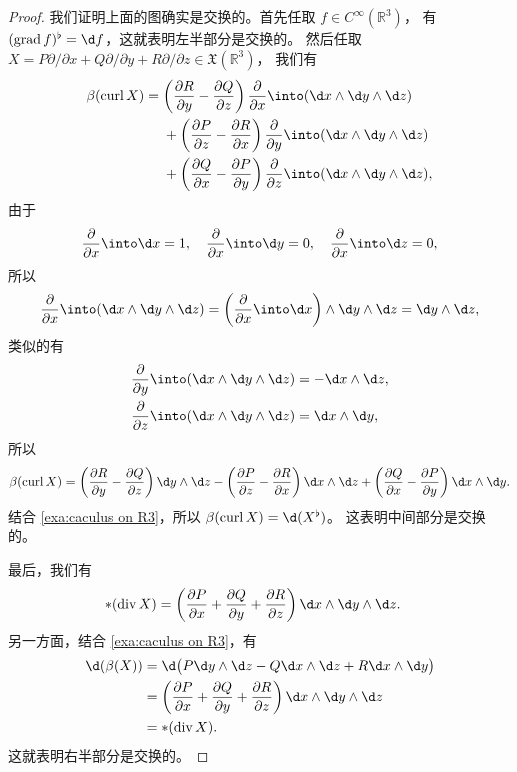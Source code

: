 \begin{proof}
  我们证明上面的图确实是交换的。首先任取 $f\in C^\infty(\mathbb{R}^3)$，
  有 $(\grad f)^\flat =\d f$，这就表明左半部分是交换的。
  然后任取 $X=P\partial/\partial x+Q\partial/\partial y+R\partial/\partial z\in \mathfrak{X}(\mathbb{R}^3)$，
  我们有
  \begin{align*}
    \beta(\curl X)&=
    \left(\frac{\partial R}{\partial y}-\frac{\partial Q}{\partial z}\right)
    \frac{\partial}{\partial x}\into 
    (\d x\wedge\d y\wedge\d z)\\
    &\hphantom{{}={}}
    +\left(\frac{\partial P}{\partial z}-\frac{\partial R}{\partial x}\right)
    \frac{\partial}{\partial y}\into 
    (\d x\wedge\d y\wedge\d z)\\
    &\hphantom{{}={}}
    +\left(\frac{\partial Q}{\partial x}-\frac{\partial P}{\partial y}\right)
    \frac{\partial}{\partial z}\into 
    (\d x\wedge\d y\wedge\d z),
  \end{align*}
  由于
  \begin{equation*}
    \frac{\partial}{\partial x}\into\d x=1,\quad
    \frac{\partial}{\partial x}\into\d y=0,\quad
    \frac{\partial}{\partial x}\into\d z=0,
  \end{equation*}
  所以
  \begin{equation*}
    \frac{\partial}{\partial x}\into 
    (\d x\wedge\d y\wedge\d z)=
    \left(\frac{\partial}{\partial x}\into\d x\right)
    \wedge\d y\wedge\d z=\d y\wedge \d z,
  \end{equation*}
  类似的有
  \begin{align*}
    \frac{\partial}{\partial y}\into 
    (\d x\wedge\d y\wedge\d z)&=-\d x\wedge \d z,\\
    \frac{\partial}{\partial z}\into 
    (\d x\wedge\d y\wedge\d z)&=\d x\wedge \d y,
  \end{align*}
  所以 
  \[
    \beta(\curl X)= 
    \left(\frac{\partial R}{\partial y}-\frac{\partial Q}{\partial z}\right)
    \d y\wedge\d z
    -\left(\frac{\partial P}{\partial z}-\frac{\partial R}{\partial x}\right)
    \d x\wedge\d z
    +\left(\frac{\partial Q}{\partial x}-\frac{\partial P}{\partial y}\right)
    \d x\wedge\d y.
  \]
  结合 \autoref{exa:caculus on R3}，所以 $\beta(\curl X)=\d(X^\flat)$。
  这表明中间部分是交换的。

  最后，我们有
  \begin{align*}
    *(\dive X)&=\left(\frac{\partial P}{\partial x}+\frac{\partial Q}{\partial y}+\frac{\partial R}{\partial z}\right)
    \d x\wedge\d y\wedge\d z.
  \end{align*}
  另一方面，结合 \autoref{exa:caculus on R3}，有
  \begin{align*}
    \d(\beta(X))&=\d\bigl(P\d y\wedge\d z-Q\d x\wedge\d z+R\d x\wedge\d y\bigr)\\
    &=\left(\frac{\partial P}{\partial x}+\frac{\partial Q}{\partial y}+\frac{\partial R}{\partial z}\right)
    \d x\wedge\d y\wedge\d z\\
    &=*(\dive X).
  \end{align*}
  这就表明右半部分是交换的。
\end{proof}

